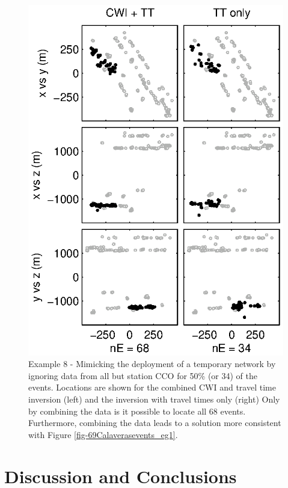 \documentclass[extra]{gji}
\begin{document}
\begin{figure}
\includegraphics{diags/CalaverasLoc6_hypoDD_SVD.eps}
\caption{Example 8 - Mimicking the deployment of a temporary network
by ignoring data from all but station CCO for 50\% (or 34) of the
events. Locations are shown for the combined CWI and travel time
inversion (left) and the inversion with travel times only (right)
Only by combining the data is it possible to locate all 68 events.
Furthermore, combining the data leads to a solution more consistent
with Figure \ref{fig-69Calaverasevents_eg1}. }
\label{fig-68Calaverasevents_ttsubsetandcoda1}
\end{figure}



\section{Discussion and Conclusions}
\end{document}
